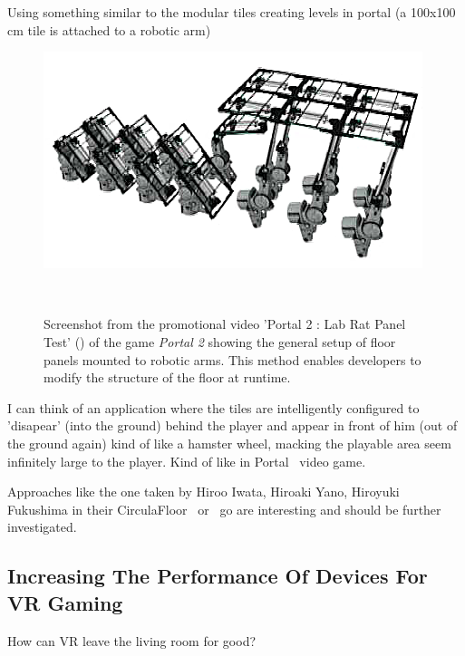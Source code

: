 Using something similar to the modular tiles creating levels in portal (a 100x100 cm tile is attached to a robotic arm)

\begin{figure}
	\centering
	\includegraphics[width=0.9\columnwidth]{./figures/portallabrattest}
	\caption[Portal 2 : Lab Rat Panel Test]{Screenshot from the promotional video 'Portal 2 : Lab Rat Panel Test' (\ccbyncsa) of the game \textit{Portal 2 \textregistered\textcopyright} showing the general setup of floor panels mounted to robotic arms. This method enables developers to modify the structure of the floor at runtime.\footnotemark}~\label{fig:portallabrattest}
\end{figure}

I can think of an application where the tiles are intelligently configured to 'disapear' (into the ground) behind the player and appear in front of him (out of the ground again) kind of like a hamster wheel, macking the playable area seem infinitely large to the player. Kind of like in Portal~\cite{game:portal} video game.

Approaches like the one taken by Hiroo Iwata, Hiroaki Yano, Hiroyuki Fukushima in their CirculaFloor~\cite{Iwata:2005:CLI:1078037.1079777} or~\cite{Souman:2010:MVW:1670671.1670675} go are interesting and should be further investigated. 


\subsection{Increasing The Performance Of Devices For VR Gaming}
How can VR leave the living room for good?
